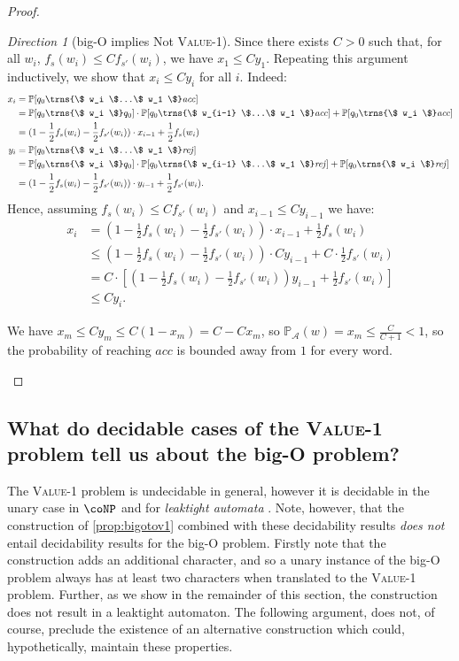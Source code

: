 \documentclass[10pt,a4paper]{amsart}
\numberwithin{equation}{section}
\theoremstyle{plain}
\theoremstyle{definition}
\theoremstyle{remark}
\newtheorem{dir}{Direction}
\newcommand\acc{\mathit{acc}}
\newcommand\rej{\mathit{rej}}
\newcommand\pr{\mathbb{P}}
\newcommand\pa{\mathcal{A}}
\renewcommand\nu{f}
\begin{document}
\begin{proof}
\begin{dir}[big-O implies Not \textsc{Value-1}]
Since there exists $C > 0$ such that, for all $w_i$, $ \nu_s(w_i)\le C \nu_{s'}(w_i) $, we have $x_1 \le C y_1$. Repeating this argument inductively, we show that $x_i \le C y_i$ for all $i$. Indeed:
\begin{align*}
x_i &= \pr[q_0 \trns{\$ w_i \$...\$ w_1 \$} \acc]
\\ &=\pr[q_0 \trns{\$ w_i \$} q_0] \cdot \pr[q_0 \trns{\$ w_{i-1} \$...\$ w_1 \$} \acc] + \pr[q_0 \trns{\$ w_i \$} \acc]
\\ &=(1- \frac{1}{2}\nu_s(w_i) -\frac{1}{2}\nu_{s'}(w_i) ) \cdot x_{i-1} + \frac{1}{2}\nu_s(w_i) \\
y_i &= \pr[q_0 \trns{\$ w_i \$...\$ w_1 \$} \rej]
\\ &=\pr[q_0 \trns{\$ w_i \$} q_0] \cdot \pr[q_0 \trns{\$ w_{i-1} \$...\$ w_1 \$} \rej] + \pr[q_0 \trns{\$ w_i \$} \rej] \\
&=(1- \frac{1}{2}\nu_s(w_i) -\frac{1}{2}\nu_{s'}(w_i) ) \cdot y_{i-1} + \frac{1}{2}\nu_{s'}(w_i).
\end{align*}
Hence, assuming $\nu_s(w_i)\le C \nu_{s'}(w_i)$ and $x_{i-1} \le C y_{i-1}$ we have: \begin{align*}x_i &=(1- \frac{1}{2}\nu_s(w_i) -\frac{1}{2}\nu_{s'}(w_i) ) \cdot x_{i-1} + \frac{1}{2}\nu_s(w_i)\\&\le (1- \frac{1}{2}\nu_s(w_i) -\frac{1}{2}\nu_{s'}(w_i) ) \cdot Cy_{i-1} + C \cdot \frac{1}{2}\nu_{s'}(w_i) \\&= C \cdot [(1- \frac{1}{2}\nu_s(w_i) -\frac{1}{2}\nu_{s'}(w_i) )y_{i-1} + \frac{1}{2}\nu_{s'}(w_i)]\\&\le Cy_{i}.\end{align*}

We have $x_m \le C y_m \le C(1-x_m) = C - C x_m$, so
$\pr_\pa(w) = x_m \le \frac{C}{C+1} < 1$, so the probability of reaching $\acc$ is bounded away from $1$ for every word.\qedhere\end{dir}\end{proof}

\subsection{What do decidable cases of the \textsc{Value-1} problem tell us about the big-O problem?}
\label{sec:val1:decidability}

The \textsc{Value-1} problem is undecidable in general, however it is decidable in the unary case  in $\coNP$ \cite{chadha2014decidable} and for \textit{leaktight automata} \cite{oualhadj2015deciding}. Note, however, that the construction of \cref{prop:bigotov1} combined with these decidability results \textit{does not} entail decidability results for the big-O problem. Firstly note that the construction adds an additional character, and so a unary instance of the big-O problem always has at least two characters when translated to the \textsc{Value-1} problem. Further, as we show in the remainder of this section, the construction does not result in a leaktight automaton.
The following argument, does not, of course, preclude the existence of an alternative construction which could, hypothetically, maintain these properties.
\end{document}
